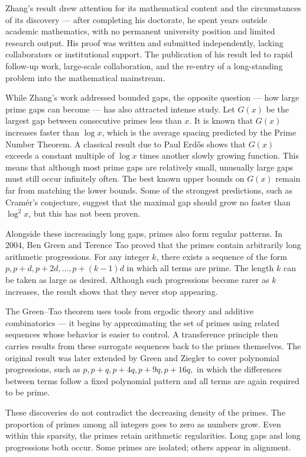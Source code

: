 Zhang's result drew attention for its mathematical content and the circumstances of its discovery — after completing his doctorate, he spent years outside academic mathematics, with no permanent university position and limited research output. His proof was written and submitted independently, lacking collaborators or institutional support. The publication of his result led to rapid follow-up work, large-scale collaboration, and the re-entry of a long-standing problem into the mathematical mainstream.

While Zhang's work addressed bounded gaps, the opposite question — how large prime gaps can become — has also attracted intense study. Let $G(x)$ be the largest gap between consecutive primes less than $x$. It is known that $G(x)$ increases faster than $\log x$, which is the average spacing predicted by the Prime Number Theorem. A classical result due to Paul Erdős shows that $G(x)$ exceeds a constant multiple of $\log x$ times another slowly growing function. This means that although most prime gaps are relatively small, unusually large gaps must still occur infinitely often. The best known upper bounds on $G(x)$ remain far from matching the lower bounds. Some of the strongest predictions, such as Cramér's conjecture, suggest that the maximal gap should grow no faster than $\log^2 x$, but this has not been proven.

Alongside these increasingly long gaps, primes also form regular patterns. In 2004, Ben Green and Terence Tao proved that the primes contain arbitrarily long arithmetic progressions. For any integer $k$, there exists a sequence of the form $p,  p + d,  p + 2d,  \dots,  p + (k - 1)d$ in which all terms are prime. The length $k$ can be taken as large as desired. Although such progressions become rarer as $k$ increases, the result shows that they never stop appearing.

The Green–Tao theorem uses tools from ergodic theory and additive combinatorics — it begins by approximating the set of primes using related sequences whose behavior is easier to control. A transference principle then carries results from these surrogate sequences back to the primes themselves. The original result was later extended by Green and Ziegler to cover polynomial progressions, such as $p,  p + q,  p + 4q,  p + 9q,  p + 16q, $ in which the differences between terms follow a fixed polynomial pattern and all terms are again required to be prime.

These discoveries do not contradict the decreasing density of the primes. The proportion of primes among all integers goes to zero as numbers grow. Even within this sparsity, the primes retain arithmetic regularities. Long gaps and long progressions both occur. Some primes are isolated; others appear in alignment. 

